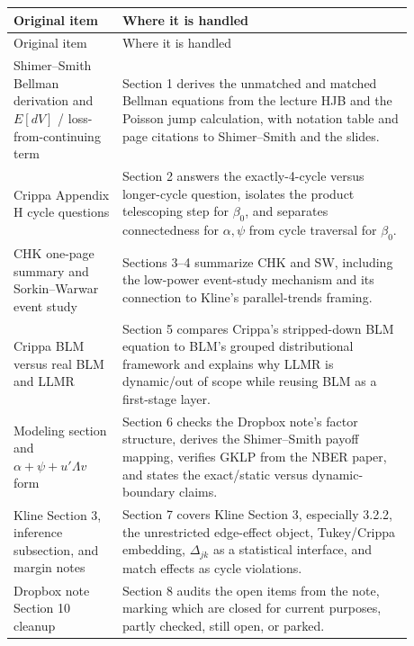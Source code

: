 \documentclass[11pt]{article}
\begin{document}
\begin{longtable}{>{\raggedright\arraybackslash}p{0.24\linewidth}
                  >{\raggedright\arraybackslash}p{0.64\linewidth}}
\toprule
Original item & Where it is handled \\
\midrule
\endfirsthead
\toprule
Original item & Where it is handled \\
\midrule
\endhead
Shimer--Smith Bellman derivation and $E[dV]$ / loss-from-continuing term & Section 1 derives the unmatched and matched Bellman equations from the lecture HJB and the Poisson jump calculation, with notation table and page citations to Shimer--Smith and the slides. \\
Crippa Appendix H cycle questions & Section 2 answers the exactly-4-cycle versus longer-cycle question, isolates the product telescoping step for $\beta_0$, and separates connectedness for $\alpha,\psi$ from cycle traversal for $\beta_0$. \\
CHK one-page summary and Sorkin--Warwar event study & Sections 3--4 summarize CHK and SW, including the low-power event-study mechanism and its connection to Kline's parallel-trends framing. \\
Crippa BLM versus real BLM and LLMR & Section 5 compares Crippa's stripped-down BLM equation to BLM's grouped distributional framework and explains why LLMR is dynamic/out of scope while reusing BLM as a first-stage layer. \\
Modeling section and $\alpha+\psi+u'\Lambda v$ form & Section 6 checks the Dropbox note's factor structure, derives the Shimer--Smith payoff mapping, verifies GKLP from the NBER paper, and states the exact/static versus dynamic-boundary claims. \\
Kline Section 3, inference subsection, and margin notes & Section 7 covers Kline Section 3, especially 3.2.2, the unrestricted edge-effect object, Tukey/Crippa embedding, $\Delta_{jk}$ as a statistical interface, and match effects as cycle violations. \\
Dropbox note Section 10 cleanup & Section 8 audits the open items from the note, marking which are closed for current purposes, partly checked, still open, or parked. \\
\bottomrule
\end{longtable}
\end{document}
